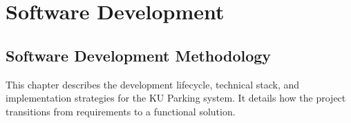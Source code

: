 \chapter{Software Development}
\label{chap:software-development}





\section{Software Development Methodology}
\label{section:software-development-methodology}
This chapter describes the development lifecycle, technical stack, and
implementation strategies for the KU Parking system. It details how the project
transitions from requirements to a functional solution.

